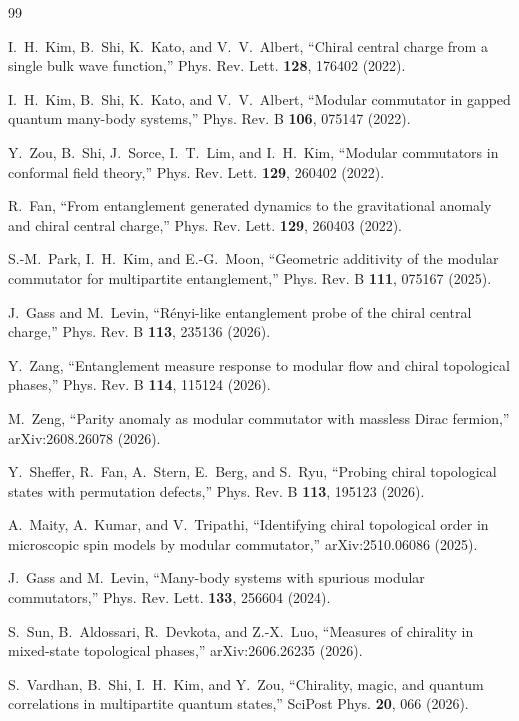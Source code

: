 \documentclass[11pt]{article}
\begin{document}
\begin{thebibliography}{99}

I.~H.~Kim, B.~Shi, K.~Kato, and V.~V.~Albert,
``Chiral central charge from a single bulk wave function,''
Phys. Rev. Lett. \textbf{128}, 176402 (2022).

I.~H.~Kim, B.~Shi, K.~Kato, and V.~V.~Albert,
``Modular commutator in gapped quantum many-body systems,''
Phys. Rev. B \textbf{106}, 075147 (2022).

Y.~Zou, B.~Shi, J.~Sorce, I.~T.~Lim, and I.~H.~Kim,
``Modular commutators in conformal field theory,''
Phys. Rev. Lett. \textbf{129}, 260402 (2022).

R.~Fan,
``From entanglement generated dynamics to the gravitational anomaly and
chiral central charge,''
Phys. Rev. Lett. \textbf{129}, 260403 (2022).

S.-M.~Park, I.~H.~Kim, and E.-G.~Moon,
``Geometric additivity of the modular commutator for multipartite
entanglement,''
Phys. Rev. B \textbf{111}, 075167 (2025).

J.~Gass and M.~Levin,
``R\'enyi-like entanglement probe of the chiral central charge,''
Phys. Rev. B \textbf{113}, 235136 (2026).

Y.~Zang,
``Entanglement measure response to modular flow and chiral topological
phases,''
Phys. Rev. B \textbf{114}, 115124 (2026).

M.~Zeng,
``Parity anomaly as modular commutator with massless Dirac fermion,''
arXiv:2608.26078 (2026).

Y.~Sheffer, R.~Fan, A.~Stern, E.~Berg, and S.~Ryu,
``Probing chiral topological states with permutation defects,''
Phys. Rev. B \textbf{113}, 195123 (2026).

A.~Maity, A.~Kumar, and V.~Tripathi,
``Identifying chiral topological order in microscopic spin models by modular
commutator,''
arXiv:2510.06086 (2025).

J.~Gass and M.~Levin,
``Many-body systems with spurious modular commutators,''
Phys. Rev. Lett. \textbf{133}, 256604 (2024).

S.~Sun, B.~Aldossari, R.~Devkota, and Z.-X.~Luo,
``Measures of chirality in mixed-state topological phases,''
arXiv:2606.26235 (2026).

S.~Vardhan, B.~Shi, I.~H.~Kim, and Y.~Zou,
``Chirality, magic, and quantum correlations in multipartite quantum
states,''
SciPost Phys. \textbf{20}, 066 (2026).


\end{thebibliography}
\end{document}
